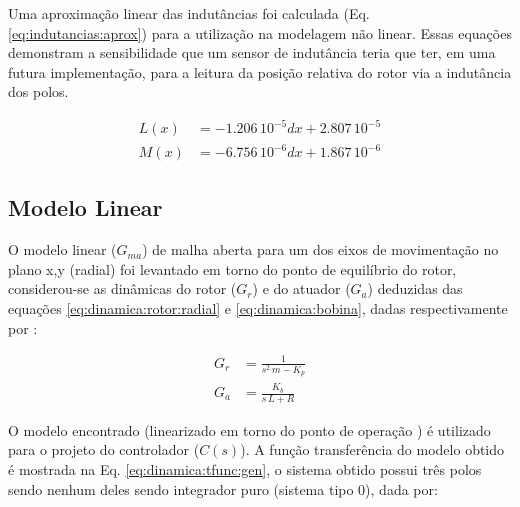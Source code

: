 Uma aproximação linear das indutâncias foi calculada (Eq. \ref{eq:indutancias:aprox}) para a utilização na modelagem não linear. Essas equações demonstram a sensibilidade que um sensor de indutância teria que ter, em uma futura implementação, para a leitura da posição relativa do rotor via a indutância dos polos.

\begin{align}
	L(x) &= -1.206 \,10^{-5} dx + 2.807 \, 10^{-5} \\
	M(x) &= -6.756 \,10^{-6} dx + 1.867 \, 10^{-6} 
	\label{eq:indutancias:aprox}
\end{align} 

%
%
%


\subsection{Modelo Linear}

O modelo linear ($G_{ma}$) de malha aberta para um dos eixos de movimentação no plano x,y (radial) foi levantado em torno do ponto de equilíbrio do rotor, considerou-se as dinâmicas do rotor ($G_r$) e do atuador ($G_a$) deduzidas das equações  \eqref{eq:dinamica:rotor:radial} e \eqref{eq:dinamica:bobina}, dadas respectivamente por :

\begin{align}
	G_r &= \frac{1}{s^2 \, m - K_p} \\
	G_a &= \frac{K_b}{s\, L + R}
\end{align}

O modelo encontrado (linearizado em torno do ponto de operação ) é utilizado para o projeto do controlador ($C(s)$). A função transferência do modelo obtido é mostrada na Eq. \eqref{eq:dinamica:tfunc:gen}, o sistema obtido possui três polos sendo nenhum deles sendo integrador puro (sistema tipo 0), dada por:

